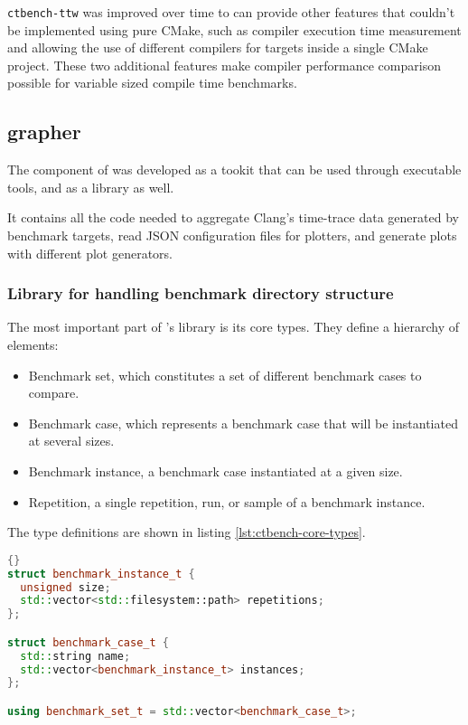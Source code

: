 \documentclass[../main]{subfiles}
\begin{document}
\lstinline{ctbench-ttw} was improved over time to can provide other features
that couldn't be implemented using pure CMake, such as compiler execution time
measurement and allowing the use of different compilers for targets inside a
single CMake project. These two additional features make compiler performance
comparison possible for variable sized compile time benchmarks.

\subsection{grapher}

The \grapher component of \ctbench was developed as a tookit that can be used
through executable tools, and as a \cpp library as well.

It contains all the code needed to aggregate Clang's time-trace data generated
by \ctbench benchmark targets, read JSON configuration files for plotters, and
generate plots with different plot generators.

\subsubsection{Library for handling benchmark directory structure}

The most important part of \ctbench's \grapher library is its core types.
They define a hierarchy of elements:

\begin{itemize}
\item Benchmark set, which constitutes a set of different benchmark cases to
      compare.
\item Benchmark case, which represents a benchmark case that will be
      instantiated at several sizes.
\item Benchmark instance, a benchmark case instantiated at a given size.
\item Repetition, a single repetition, run, or sample of a benchmark instance.
\end{itemize}

The type definitions are shown in listing \ref{lst:ctbench-core-types}.

\begin{lstlisting}[language=C++, label=lst:ctbench-core-types]{}
struct benchmark_instance_t {
  unsigned size;
  std::vector<std::filesystem::path> repetitions;
};

struct benchmark_case_t {
  std::string name;
  std::vector<benchmark_instance_t> instances;
};

using benchmark_set_t = std::vector<benchmark_case_t>;
\end{lstlisting}
\end{document}

